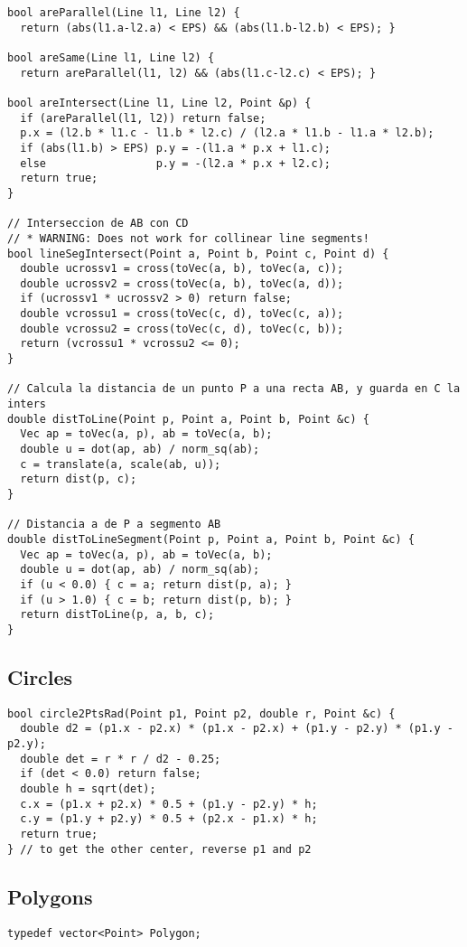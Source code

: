\documentclass[8pt, oneside]{extarticle}
\begin{document}
\begin{multicols}{3}
\begin{lstlisting}
bool areParallel(Line l1, Line l2) {
  return (abs(l1.a-l2.a) < EPS) && (abs(l1.b-l2.b) < EPS); }

bool areSame(Line l1, Line l2) {
  return areParallel(l1, l2) && (abs(l1.c-l2.c) < EPS); }

bool areIntersect(Line l1, Line l2, Point &p) {
  if (areParallel(l1, l2)) return false;
  p.x = (l2.b * l1.c - l1.b * l2.c) / (l2.a * l1.b - l1.a * l2.b);
  if (abs(l1.b) > EPS) p.y = -(l1.a * p.x + l1.c);
  else                 p.y = -(l2.a * p.x + l2.c);
  return true;
}

// Interseccion de AB con CD
// * WARNING: Does not work for collinear line segments!
bool lineSegIntersect(Point a, Point b, Point c, Point d) {
  double ucrossv1 = cross(toVec(a, b), toVec(a, c));
  double ucrossv2 = cross(toVec(a, b), toVec(a, d));
  if (ucrossv1 * ucrossv2 > 0) return false;
  double vcrossu1 = cross(toVec(c, d), toVec(c, a));
  double vcrossu2 = cross(toVec(c, d), toVec(c, b));
  return (vcrossu1 * vcrossu2 <= 0);
}

// Calcula la distancia de un punto P a una recta AB, y guarda en C la inters
double distToLine(Point p, Point a, Point b, Point &c) {
  Vec ap = toVec(a, p), ab = toVec(a, b);
  double u = dot(ap, ab) / norm_sq(ab);
  c = translate(a, scale(ab, u));
  return dist(p, c);
}

// Distancia a de P a segmento AB
double distToLineSegment(Point p, Point a, Point b, Point &c) {
  Vec ap = toVec(a, p), ab = toVec(a, b);
  double u = dot(ap, ab) / norm_sq(ab);
  if (u < 0.0) { c = a; return dist(p, a); }
  if (u > 1.0) { c = b; return dist(p, b); }
  return distToLine(p, a, b, c);
}
\end{lstlisting}

\subsection{Circles}
\begin{lstlisting}
bool circle2PtsRad(Point p1, Point p2, double r, Point &c) {
  double d2 = (p1.x - p2.x) * (p1.x - p2.x) + (p1.y - p2.y) * (p1.y - p2.y);
  double det = r * r / d2 - 0.25;
  if (det < 0.0) return false;
  double h = sqrt(det);
  c.x = (p1.x + p2.x) * 0.5 + (p1.y - p2.y) * h;
  c.y = (p1.y + p2.y) * 0.5 + (p2.x - p1.x) * h;
  return true;
} // to get the other center, reverse p1 and p2
\end{lstlisting}

\subsection{Polygons}
\begin{lstlisting}
typedef vector<Point> Polygon;


\end{lstlisting}
\end{multicols}
\end{document}
